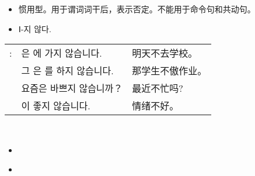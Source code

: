 \begin{grammar}
    \begin{grammarsect}[-지 않다]
    \begin{itemize}
        \item 惯用型。用于谓词词干后，表示否定。不能用于命令句和共动句。
        \item {\color{gray} Ⅰ-지 않다.}
    \end{itemize}
    \begin{tabular}{lll}
        \ruby{例}{예}: &\ruby{來日}{내일}은 \ruby{學校}{학교}에 가지 않습니다. &明天不去学校。\\
        &그 \ruby{學生}{학생}은 \ruby{宿題}{숙제}를 하지 않습니다.& 那学生不傲作业。\\
        &요즘은 바쁘지 않습니까？ &最近不忙吗?\\
        &\ruby{氣分}{기분}이 좋지 않습니다. &情绪不好。\\
    \end{tabular}\\
    \end{grammarsect}
\end{grammar}
\begin{grammar}
    \begin{grammarsect}[]
    \begin{itemize}
        \item 
    \end{itemize}
    \end{grammarsect}
\end{grammar}
\begin{grammar}
    \begin{grammarsect}[-에]
    \begin{itemize}
        \item 
    \end{itemize}
    \end{grammarsect}
    \begin{grammarsect}[-과 / -와]\label{gram:ua}
        
    \end{grammarsect}
\end{grammar}